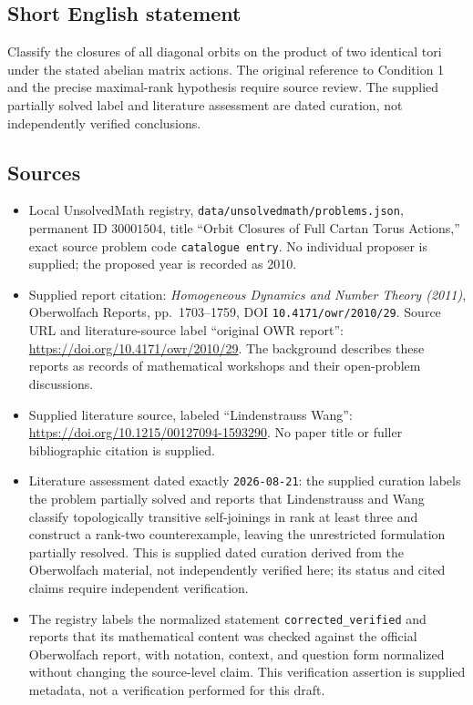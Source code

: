 \documentclass[11pt]{article}
\begin{document}
\subsection{Short English statement}
Classify the closures of all diagonal orbits on the product of two identical tori under the stated abelian matrix actions. The original reference to Condition 1 and the precise maximal-rank hypothesis require source review. The supplied partially solved label and literature assessment are dated curation, not independently verified conclusions.
\subsection{Sources}
\begin{itemize}
\item Local UnsolvedMath registry, \texttt{data/unsolvedmath/problems.json}, permanent ID \(30001504\), title ``Orbit Closures of Full Cartan Torus Actions,'' exact source problem code \texttt{catalogue entry}. No individual proposer is supplied; the proposed year is recorded as 2010.
\item Supplied report citation: \emph{Homogeneous Dynamics and Number Theory (2011)}, Oberwolfach Reports, pp.\ 1703--1759, DOI \texttt{10.4171/owr/2010/29}. Source URL and literature-source label ``original OWR report'': \url{https://doi.org/10.4171/owr/2010/29}. The background describes these reports as records of mathematical workshops and their open-problem discussions.
\item Supplied literature source, labeled ``Lindenstrauss Wang'': \url{https://doi.org/10.1215/00127094-1593290}. No paper title or fuller bibliographic citation is supplied.
\item Literature assessment dated exactly \texttt{2026-08-21}: the supplied curation labels the problem partially solved and reports that Lindenstrauss and Wang classify topologically transitive self-joinings in rank at least three and construct a rank-two counterexample, leaving the unrestricted formulation partially resolved. This is supplied dated curation derived from the Oberwolfach material, not independently verified here; its status and cited claims require independent verification.
\item The registry labels the normalized statement \texttt{corrected\_verified} and reports that its mathematical content was checked against the official Oberwolfach report, with notation, context, and question form normalized without changing the source-level claim. This verification assertion is supplied metadata, not a verification performed for this draft.
\end{itemize}
\end{document}
